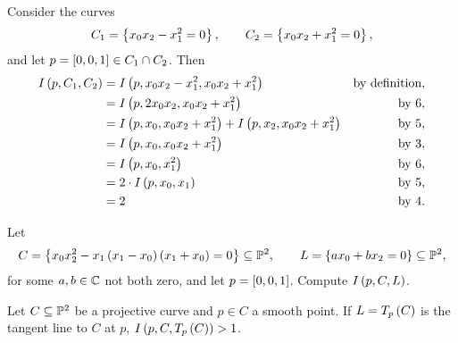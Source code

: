 \begin{example}
Consider the curves
$$ C_1 = \cb{x_0x_2 - x_1^2 = 0}, \qquad C_2 = \cb{x_0x_2 + x_1^2 = 0}, $$
and let $ p = \sb{0, 0, 1} \in C_1 \cap C_2 $. Then
\begin{align*}
I\rb{p, C_1, C_2}
& = I\rb{p, x_0x_2 - x_1^2, x_0x_2 + x_1^2} & \text{by definition}, \\
& = I\rb{p, 2x_0x_2, x_0x_2 + x_1^2} & \text{by} \ 6, \\
& = I\rb{p, x_0, x_0x_2 + x_1^2} + I\rb{p, x_2, x_0x_2 + x_1^2} & \text{by} \ 5, \\
& = I\rb{p, x_0, x_0x_2 + x_1^2} & \text{by} \ 3, \\
& = I\rb{p, x_0, x_1^2} & \text{by} \ 6, \\
& = 2 \cdot I\rb{p, x_0, x_1} & \text{by} \ 5, \\
& = 2 & \text{by} \ 4.
\end{align*}
\end{example}


\begin{exercise}
Let
$$ C = \cb{x_0x_2^2 - x_1\rb{x_1 - x_0}\rb{x_1 + x_0} = 0} \subseteq \P^2, \qquad L = \cb{ax_0 + bx_2 = 0} \subseteq \P^2, $$
for some $ a, b \in \C $ not both zero, and let $ p = \sb{0, 0, 1} $. Compute $ I\rb{p, C, L} $.
\end{exercise}

\begin{proposition}
Let $ C \subseteq \P^2 $ be a projective curve and $ p \in C $ a smooth point. If $ L = T_p\rb{C} $ is the tangent line to $ C $ at $ p $, $ I\rb{p, C, T_p\rb{C}} > 1 $.
\end{proposition}

